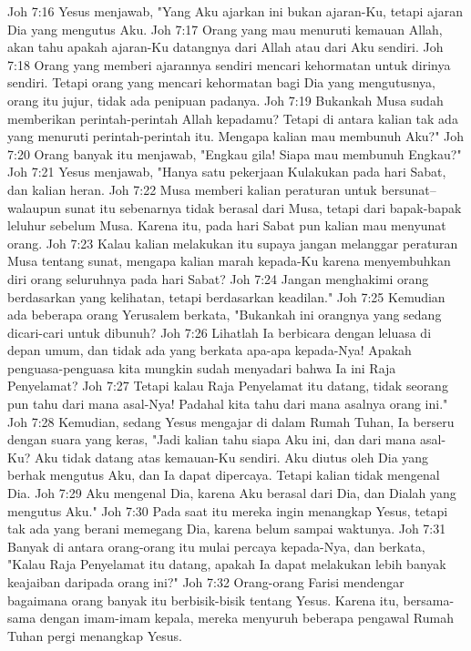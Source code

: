 Joh 7:16  Yesus menjawab, "Yang Aku ajarkan ini bukan ajaran-Ku, tetapi ajaran Dia yang mengutus Aku.
Joh 7:17  Orang yang mau menuruti kemauan Allah, akan tahu apakah ajaran-Ku datangnya dari Allah atau dari Aku sendiri.
Joh 7:18  Orang yang memberi ajarannya sendiri mencari kehormatan untuk dirinya sendiri. Tetapi orang yang mencari kehormatan bagi Dia yang mengutusnya, orang itu jujur, tidak ada penipuan padanya.
Joh 7:19  Bukankah Musa sudah memberikan perintah-perintah Allah kepadamu? Tetapi di antara kalian tak ada yang menuruti perintah-perintah itu. Mengapa kalian mau membunuh Aku?"
Joh 7:20  Orang banyak itu menjawab, "Engkau gila! Siapa mau membunuh Engkau?"
Joh 7:21  Yesus menjawab, "Hanya satu pekerjaan Kulakukan pada hari Sabat, dan kalian heran.
Joh 7:22  Musa memberi kalian peraturan untuk bersunat--walaupun sunat itu sebenarnya tidak berasal dari Musa, tetapi dari bapak-bapak leluhur sebelum Musa. Karena itu, pada hari Sabat pun kalian mau menyunat orang.
Joh 7:23  Kalau kalian melakukan itu supaya jangan melanggar peraturan Musa tentang sunat, mengapa kalian marah kepada-Ku karena menyembuhkan diri orang seluruhnya pada hari Sabat?
Joh 7:24  Jangan menghakimi orang berdasarkan yang kelihatan, tetapi berdasarkan keadilan."
Joh 7:25  Kemudian ada beberapa orang Yerusalem berkata, "Bukankah ini orangnya yang sedang dicari-cari untuk dibunuh?
Joh 7:26  Lihatlah Ia berbicara dengan leluasa di depan umum, dan tidak ada yang berkata apa-apa kepada-Nya! Apakah penguasa-penguasa kita mungkin sudah menyadari bahwa Ia ini Raja Penyelamat?
Joh 7:27  Tetapi kalau Raja Penyelamat itu datang, tidak seorang pun tahu dari mana asal-Nya! Padahal kita tahu dari mana asalnya orang ini."
Joh 7:28  Kemudian, sedang Yesus mengajar di dalam Rumah Tuhan, Ia berseru dengan suara yang keras, "Jadi kalian tahu siapa Aku ini, dan dari mana asal-Ku? Aku tidak datang atas kemauan-Ku sendiri. Aku diutus oleh Dia yang berhak mengutus Aku, dan Ia dapat dipercaya. Tetapi kalian tidak mengenal Dia.
Joh 7:29  Aku mengenal Dia, karena Aku berasal dari Dia, dan Dialah yang mengutus Aku."
Joh 7:30  Pada saat itu mereka ingin menangkap Yesus, tetapi tak ada yang berani memegang Dia, karena belum sampai waktunya.
Joh 7:31  Banyak di antara orang-orang itu mulai percaya kepada-Nya, dan berkata, "Kalau Raja Penyelamat itu datang, apakah Ia dapat melakukan lebih banyak keajaiban daripada orang ini?"
Joh 7:32  Orang-orang Farisi mendengar bagaimana orang banyak itu berbisik-bisik tentang Yesus. Karena itu, bersama-sama dengan imam-imam kepala, mereka menyuruh beberapa pengawal Rumah Tuhan pergi menangkap Yesus.
